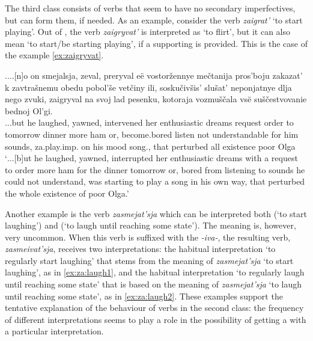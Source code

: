 The third class consists of verbs that seem to have no secondary imperfectives, but can form them, if needed. As an example, consider the verb \textit{zaigrat'} `to start playing'. Out of , the verb \textit{zaigryvat'} is interpreted as `to flirt', but it can also mean `to start/be starting playing', if a supporting  is provided. This is the case of the example \ref{ex:zaigryvat}. 

\exg.\label{ex:zaigryvat}$\ldots$[n]o on smejalsja, zeval, preryval e\"{e} vostor\v{z}ennye me\v{c}tanija pros'boju zakazat' k zavtra\v{s}nemu obedu pobol'\v{s}e vet\v{c}iny ili, sosku\v{c}iv\v{s}is' slu\v{s}at' neponjatnye dlja nego zvuki, zaigryval na svoj lad pesenku, kotoraja vozmu\v{s}\v{c}ala vs\"{e} su\v{s}\v{c}estvovanie bednoj Ol'gi.\\
$\ldots$but he laughed, yawned, intervened her enthusiastic dreams request order to tomorrow dinner more ham or, {become.bored} listen {not understandable} for him sounds, za.play.imp. on his mood song., that perturbed all existence poor Olga\\
\trans `$\ldots$[b]ut he laughed, yawned, interrupted her enthusiastic dreams with a request to order more ham for the dinner tomorrow or, bored from listening to sounds he could not understand, was starting to play a song in his own way, that perturbed the whole existence of poor Olga.'\\

Another example is the verb \textit{zasmejat'sja} which can be interpreted both  (`to start laughing') and  (`to laugh until reaching some state'). The  meaning is, however, very uncommon. When this verb is suffixed with the  \textit{-iva-}, the resulting verb, \textit{zasmeivat'sja}, receives two interpretations: the habitual interpretation `to regularly start laughing' that stems from the  meaning of \textit{zasmejat'sja} `to start laughing', as in \ref{ex:za:laugh1}, and the habitual interpretation `to regularly laugh until reaching some state' that is based on the  meaning of \textit{zasmejat'sja} `to laugh until reaching some state', as in \ref{ex:za:laugh2}. These examples support the tentative explanation of the behaviour of verbs in the second class: the frequency of different interpretations seems to play a role in the possibility of getting a  with a particular interpretation.

